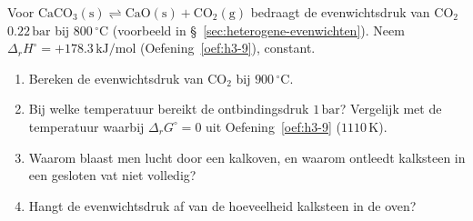 \begin{oefening}
Voor \(\mathrm{CaCO_3(s) \rightleftharpoons CaO(s) + CO_2(g)}\) bedraagt de evenwichtsdruk van \(\mathrm{CO_2}\) \(0.22\,\mathrm{bar}\) bij \(800\,^\circ\mathrm{C}\) (voorbeeld in \S~\ref{sec:heterogene-evenwichten}). Neem \(\Delta_r H^\circ = +178.3\,\mathrm{kJ/mol}\) (Oefening~\ref{oef:h3-9}), constant.

\begin{enumerate}
\item[(a)]
  Bereken de evenwichtsdruk van \(\mathrm{CO_2}\) bij \(900\,^\circ\mathrm{C}\).
\item[(b)]
  Bij welke temperatuur bereikt de ontbindingsdruk \(1\,\mathrm{bar}\)? Vergelijk met de temperatuur waarbij \(\Delta_r G^\circ = 0\) uit Oefening~\ref{oef:h3-9} (\(1110\,\mathrm{K}\)).
\item[(c)]
  Waarom blaast men lucht door een kalkoven, en waarom ontleedt kalksteen in een gesloten vat niet volledig?
\item[(d)]
  Hangt de evenwichtsdruk af van de hoeveelheid kalksteen in de oven?
\end{enumerate}
\end{oefening}
